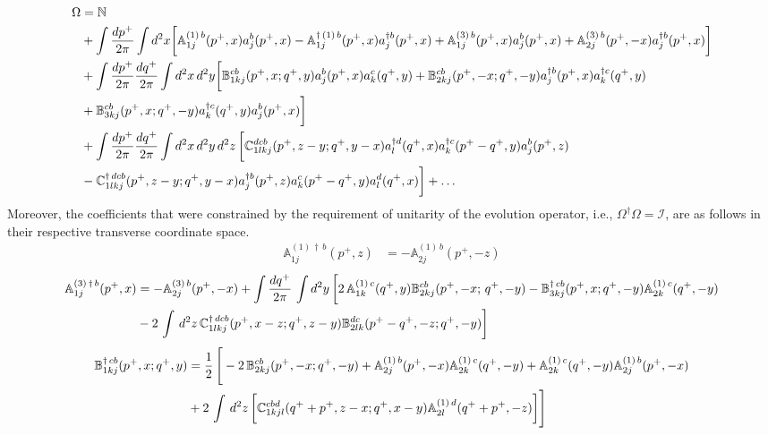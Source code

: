 \documentclass[10pt]{article}
\def\mf#1{\mathbb{#1}}
\numberwithin{equation}{section}
\begin{document}
\begin{align}
    \Omega & = \mf{N} \notag \\ & +
                \int \frac{d p^+}{2\pi} 
             \int d^2 x  
                \bigg[\mf{A}^{(1)\, b}_{1j}(p^{+},x)a^{b}_{j}(p^{+},x) 
                -  \mf{A}^{\dagger\, (1)\, b}_{1j} (p^{+},x) a^{\dagger b}_{j}(p^{+},x)+ \mf{A}^{(3)\, b}_{1j}(p^{+},x)a^{b}_{j}(p^{+},x) 
                +  \mf{A}^{(3)\, b}_{2j} (p^{+},-x) a^{\dagger b}_{j}(p^{+},x)\bigg] \notag \\ & 
               +\int \frac{d p^+}{2\pi} \frac{d q^+}{2\pi} \int d^2x\, d^2y  
               \bigg[\mf{B}^{cb}_{1kj}(p^{+}, x;q^{+}, y) a^{b}_{j}(p^{+},x)a^{c}_{k}(q^{+},y) 
                   + \mf{B}^{cb}_{2kj}(p^{+},-x; q^{+},-y) a^{\dagger b}_{j}(p^{+},x)a^{\dagger c}_{k}(q^{+},y)
            \notag \\ & 
                  + \mf{B}^{cb}_{3kj} (p^{+},x; q^{+}, -y) a^{\dagger c}_{k}(q^{+},y)a^{b}_{j}(p^{+},x)\bigg] \notag \\ & 
               + \int 
               \frac{d p^+}{2\pi} \frac{dq^+}{2\pi} 
               \int d^2x\, d^2y\,  d^2 z\, 
               \bigg[\mf{C}^{ dcb}_{1lkj}(p^{+},z-y; q^{+},y-x) a^{\dagger d}_{l}(q^{+},x)  a^{\dagger c}_{k}(p^{+}-q^{+}, y)  a^{b}_{j}(p^{+},z)
               \notag \\ & 
               -  \mf{C}^{\dagger\, dcb}_{1lkj}(p^{+},z-y; q^{+}, y-x) a^{\dagger b}_{j}(p^{+},z) a^{c}_{k}(p^{+}-q^{+},y) a^{d}_{l}(q^{+},x)\bigg] + \ldots
\end{align}
Moreover, the coefficients that were constrained by the requirement of unitarity of the evolution operator, i.e., $\Omega^{\dagger}\Omega = \mathcal{I}$, are as follows in their respective transverse coordinate space. 
\begin{align}
    \mf{A}^{(1)\, \dagger\,  b}_{1j}(p^{+},z) & =  -\mf{A}^{(1)\, b}_{2j}(p^{+},-z)
\end{align}
\begin{align}
 \mf{A}^{(3)\, \dagger\, b}_{1j}(p^{+},x) & = -\mf{A}^{(3)\, b}_{2j}(p^{+}, -x) +\int \frac{dq^{+}}{2\pi}\, \int d^{2}y\, \bigg[2\, \mf{A}^{(1)\, c}_{1k}(q^{+}, y)\mf{B}^{cb}_{2kj}(p^{+}, -x;\, q^{+},-y)-\mf{B}^{\dagger\, cb}_{3kj}(p^{+}, x; q^{+}, -y)\mf{A}^{(1)\,c}_{2k}(q^{+},-y)\notag \\ & -2\,\int\, d^{2}z\, \mf{C}^{\dagger\, dcb}_{1lkj}(p^{+},x-z; q^{+},z-y)\mf{B}^{dc}_{2lk}(p^{+}-q^{+},-z; q^{+},-y)\bigg]
\end{align}
\begin{align}
    \mf{B}^{\dagger\, cb}_{1kj}(p^{+},x; q^{+},y) & = \frac{1}{2}\, \Bigg[-2\,\mf{B}^{cb}_{2kj}(p^{+},-x; q^{+},-y)+\mf{A}^{(1)\, b}_{2j}(p^{+},-x)\mf{A}^{(1)\, c}_{2k}(q^{+},-y)+ \mf{A}^{(1)\, c}_{2k}(q^{+},-y)\mf{A}^{(1)\, b}_{2j}(p^{+},-x)\notag \\ & +2\,\int\, d^{2}z\, \bigg[\mf{C}^{cbd}_{1kjl}(q^{+}+p^{+},z-x; q^{+},x-y)\mf{A}^{(1)\,d}_{2l}(q^{+}+p^{+},-z)\bigg]\Bigg]
\end{align}
\end{document}

